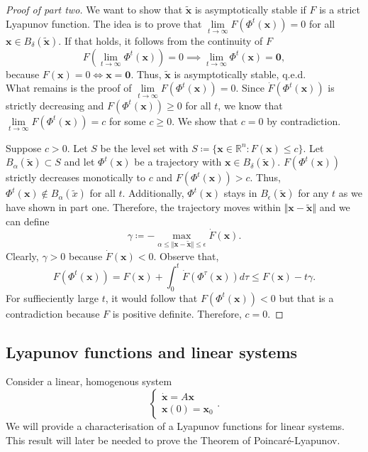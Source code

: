 \documentclass[hidelinks,a4paper, 11pt]{article}
\theoremstyle{plain}
\theoremstyle{break}
\theoremstyle{plain}
\theoremstyle{definition}
\begin{document}
\begin{proof}[Proof of part two]
	We want to show that $\mathbf{\tilde x }$ is asymptotically stable if $F$ is a strict Lyapunov function. The idea is to prove that $\lim\limits_{t \to \infty}F(\Phi^t(\mathbf x)) = 0$ for all $\mathbf x \in B_{\delta}(\mathbf{\tilde x})$. If that holds, it follows from  the continuity of $F$  
	\[
		F(\lim\limits_{t \to \infty} \Phi^t(\mathbf x)) = 0 \implies \lim\limits_{t \to \infty} \Phi^t(\mathbf x)= \mathbf 0,
	\]
	because $F(\mathbf x) = 0 \iff \mathbf x = \mathbf 0$. Thus, $\mathbf{\tilde x}$ is asymptotically stable, q.e.d.\\
	
	What remains is the proof of $\lim\limits_{t \to \infty}F(\Phi^t(\mathbf x)) = 0$. Since $\dot F(\Phi^t(\mathbf x))$ is strictly decreasing and $F(\Phi^t(\mathbf x)) \geq 0$ for all $t$, we know that $ \lim\limits_{t \to \infty} F(\Phi^t(\mathbf x)) = c$ for some $c \geq 0$. We show that $c = 0$ by contradiction. 
	
	Suppose $c > 0$. Let $S$ be the level set with $S \coloneqq \{ \mathbf x \in \mathbb R^n : F(\mathbf x) \leq c \}$. Let $B_{\alpha}(\mathbf{\tilde x}) \subset S$ and let $\Phi^t(\mathbf x)$ be a trajectory with $\mathbf x \in B_{\delta}(\mathbf{\tilde x})$. $F(\Phi^t(\mathbf x))$ strictly decreases monotically to $c$ and $F(\Phi^t(\mathbf{x})) > c$. Thus, $\Phi^t(\mathbf{x}) \notin B_{\alpha}(\tilde x)$ for all $t$. Additionally, $\Phi^t(\mathbf x)$ stays in $B_{\epsilon}(\mathbf{\tilde x})$ for any $t$ as we have shown in part one. Therefore, the trajectory moves within $\Vert \mathbf x - \mathbf{\tilde x} \Vert$ and we can define
	\[
		\gamma \coloneqq - \max_{\alpha\leq\Vert \mathbf x - \mathbf{\tilde x} \Vert \leq \epsilon} \dot F(\mathbf x).
	\]
	Clearly, $\gamma > 0$ because $\dot F(\mathbf x) < 0$. Observe that,
	\[
		F(\Phi^t(\mathbf x)) = F(\mathbf x) + \int^t_0 \dot F(\Phi^{\tau}(\mathbf x)) d\tau \leq F(\mathbf x) - t\gamma.
	\]
	For suffieciently large $t$, it would follow that $F(\Phi^t(\mathbf x)) < 0$ but that is a contradiction because $F$ is positive definite. Therefore, $c = 0$.
\end{proof}


\subsection{Lyapunov functions and linear systems}
Consider a linear, homogenous system
\[
	\begin{cases}
		\mathbf{\dot x} = A \mathbf x \\
		\mathbf x(0) = \mathbf x_0
	\end{cases}.
\]
We will provide a characterisation of a Lyapunov functions for linear systems. This result will later be needed to prove the Theorem of Poincaré-Lyapunov.
\end{document}

